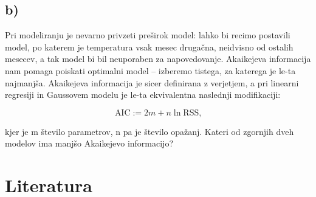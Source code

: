 \documentclass[12pt, a4paper]{article}
\begin{document}
\subsection*{b)}
Pri modeliranju je nevarno privzeti preširok model: lahko bi recimo postavili
model, po katerem je temperatura vsak mesec drugačna, neidvisno od ostalih
mesecev, a tak model bi bil neuporaben za napovedovanje. Akaikejeva 
informacija nam pomaga poiskati optimalni model – izberemo tistega, za katerega
je le-ta najmanjša. Akaikejeva informacija je sicer definirana z verjetjem, 
a pri linearni regresiji in Gaussovem modelu je le-ta ekvivalentna naslednji 
modifikaciji:  

\[
    \text{AIC} := 2m + n \ln \text{RSS,}
    \]

kjer je m število parametrov, n pa je število opažanj. Kateri od zgornjih dveh
modelov ima manjšo Akaikejevo informacijo?



\section*{Literatura}
\end{document}

